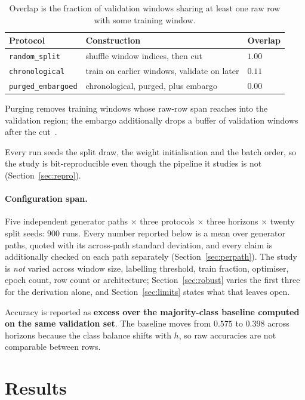 \documentclass[11pt,a4paper]{article}
\begin{document}
\begin{table}[h]
\centering
\begin{tabular}{lll}
\toprule
Protocol & Construction & Overlap \\
\midrule
\texttt{random\_split} & shuffle window indices, then cut & $1.00$ \\
\texttt{chronological} & train on earlier windows, validate on later & $0.11$ \\
\texttt{purged\_embargoed} & chronological, purged, plus embargo & $0.00$ \\
\bottomrule
\end{tabular}
\caption{Overlap is the fraction of validation windows sharing at least one raw
row with some training window.}
\end{table}

Purging removes training windows whose raw-row span reaches into the validation
region; the embargo additionally drops a buffer of validation windows after the
cut~\cite{lopezdeprado2018}.

Every run seeds the split draw, the weight initialisation and the batch order,
so the study is bit-reproducible even though the pipeline it studies is not
(Section~\ref{sec:repro}).

\paragraph{Configuration span.} Five independent generator paths $\times$ three
protocols $\times$ three horizons $\times$ twenty split seeds: $900$ runs. Every
number reported below is a mean over generator paths, quoted with its across-path
standard deviation, and every claim is additionally checked on each path
separately (Section~\ref{sec:perpath}). The study is \emph{not} varied across
window size, labelling threshold, train fraction, optimiser, epoch count, row
count or architecture; Section~\ref{sec:robust} varies the first three for the
derivation alone, and Section~\ref{sec:limits} states what that leaves open.

Accuracy is reported as \textbf{excess over the majority-class baseline computed
on the same validation set}. The baseline moves from $0.575$ to $0.398$ across
horizons because the class balance shifts with $h$, so raw accuracies are not
comparable between rows.

\section{Results}
\end{document}
